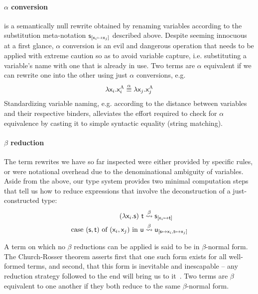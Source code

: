\paragraph{$\alpha$ conversion} is a semantically null rewrite obtained by renaming variables according to the substitution meta-notation $\mathsf{s}_{[\mathsf{\mathsf{x}_{\mathnormal{i}} } \mapsto \mathsf{\mathsf{x}_{\mathnormal{j}}}]}$ described above. 
Despite seeming innocuous at a first glance, $\alpha$ conversion is an evil and dangerous operation that needs to be applied with extreme caution so as to avoid variable capture, i.e. substituting a variable's name with one that is already in use.  
Two terms are $\alpha$ equivalent if we can rewrite one into the other using just $\alpha$ conversions, e.g.
\begin{equation}
	\mathnormal{\lambda} \mathsf{x}_{\mathnormal{i}} .\mathsf{x}_{\mathnormal{i}} ^{\normalfont\textsc{A}} \overset{\alpha}{\equiv} \mathnormal{\lambda} \mathsf{x}_{\mathnormal{j}}.\mathsf{x}_{\mathnormal{j}}^{\normalfont\textsc{A}}
\end{equation}
Standardizing variable naming, e.g. according to the distance between variables and their respective binders, alleviates the effort required to check for $\alpha$ equivalence by casting it to simple syntactic equality (string matching).

\paragraph{$\beta$ reduction}
The term rewrites we have so far inspected were either provided by specific rules, or were notational overhead due to the denominational ambiguity of variables.
Aside from the above, our type system provides two minimal computation steps that tell us how to reduce expressions that involve the deconstruction of a just-constructed type:
\begin{align}
(\mathsf{\mathnormal{\lambda} \mathsf{x}_{\mathnormal{i}} .s})~\mathsf{t} & \overset{\beta}{\leadsto} \mathsf{s}_{[\mathsf{\mathsf{x}_{\mathnormal{i}} } \mapsto \mathsf{t}]}\\
\textrm{case \ensuremath{\mathsf{(s, t)}} of \ensuremath{\mathsf{(\mathsf{x}_{\mathnormal{i}}, \mathsf{x}_{\mathnormal{j}})}} in \ensuremath{\mathsf{u}}} & \overset{\beta}{\leadsto} \mathsf{u_{[\mathsf{s} \mapsto \mathsf{\mathsf{x}_{\mathnormal{i}} }, \mathsf{t} \mapsto \mathsf{\mathsf{x}_{\mathnormal{j}}}]}}
\end{align}

A term on which no $\beta$ reductions can be applied is said to be in $\beta$-normal form.
The Church-Rosser theorem asserts first that one such form exists for all well-formed terms, and second, that this form is inevitable and inescapable -- any reduction strategy followed to the end will bring us to it~\cite{barendregt1984lambda}.
Two terms are $\beta$ equivalent to one another if they both reduce to the same $\beta$-normal form.

